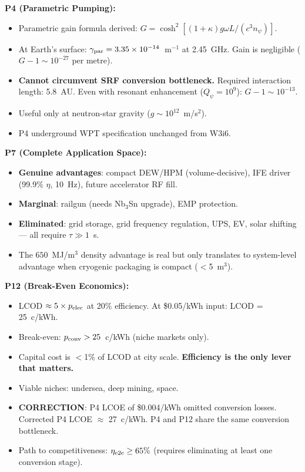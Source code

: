 \documentclass[11pt]{article}
\newcommand{\ee}[1]{\times 10^{#1}}
\newcommand{\Qpsi}{Q_\psi}
\newcommand{\npsi}{n_\psi}
\begin{document}
\begin{tcolorbox}[colback=green!5!white, colframe=green!60!black,
  title=\textbf{W3i7 P4+P7+P12 Bottom Line}]

\textbf{P4 (Parametric Pumping):}
\begin{itemize}[nosep]
  \item Parametric gain formula derived:
    $G = \cosh^2[(1+\kappa)g\omega L/(c^3\npsi)]$.
  \item At Earth's surface: $\gamma_{\rm par} = 3.35\ee{-14}$~m$^{-1}$
    at 2.45~GHz. Gain is negligible ($G - 1 \sim 10^{-27}$ per metre).
  \item \textbf{Cannot circumvent SRF conversion bottleneck.}
    Required interaction length: 5.8~AU. Even with resonant enhancement
    ($\Qpsi = 10^9$): $G - 1 \sim 10^{-13}$.
  \item Useful only at neutron-star gravity ($g \sim 10^{12}$~m/s$^2$).
  \item P4 underground WPT specification unchanged from W3i6.
\end{itemize}

\medskip

\textbf{P7 (Complete Application Space):}
\begin{itemize}[nosep]
  \item \textbf{Genuine advantages}: compact DEW/HPM (volume-decisive),
    IFE driver (99.9\% $\eta$, 10~Hz), future accelerator RF fill.
  \item \textbf{Marginal}: railgun (needs Nb$_3$Sn upgrade), EMP
    protection.
  \item \textbf{Eliminated}: grid storage, grid frequency regulation,
    UPS, EV, solar shifting --- all require $\tau \gg 1$~s.
  \item The $650$~MJ/m$^3$ density advantage is real but only
    translates to system-level advantage when cryogenic packaging is
    compact ($<$5~m$^3$).
\end{itemize}

\medskip

\textbf{P12 (Break-Even Economics):}
\begin{itemize}[nosep]
  \item LCOD $\approx 5\times p_{\rm elec}$ at 20\% efficiency.
    At \$0.05/kWh input: LCOD = 25~c/kWh.
  \item Break-even: $p_{\rm conv} > 25$~c/kWh (niche markets only).
  \item Capital cost is $<$1\% of LCOD at city scale. \textbf{Efficiency
    is the only lever that matters.}
  \item Viable niches: undersea, deep mining, space.
  \item \textbf{CORRECTION}: P4 LCOE of \$0.004/kWh omitted conversion
    losses. Corrected P4 LCOE $\approx$ 27~c/kWh. P4 and P12 share
    the same conversion bottleneck.
  \item Path to competitiveness: $\eta_{\rm e2e} \geq 65\%$ (requires
    eliminating at least one conversion stage).
\end{itemize}


\end{tcolorbox}
\end{document}
